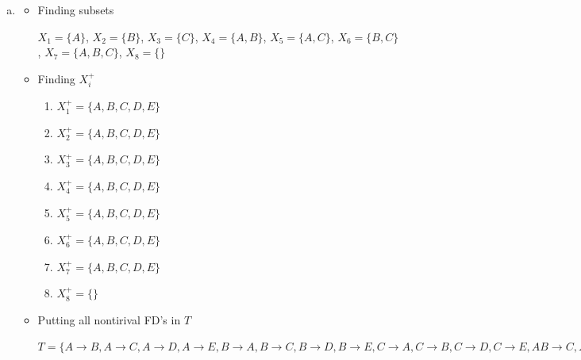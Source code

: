 \documentclass[12pt]{article}
\begin{document}
\begin{enumerate}[1.]
\begin{enumerate}[a)]
\begin{itemize}
            \item Putting all nontirival FD's in $T$

            $T = \{AB \to D, AC \to B, AC \to D, AC \to E, BC \to A, BC \to D, BC \to E,
                   ABC \to D, ABC \to E\}$

            \item Finding minimal basis for the FD of $S$

            $T_{\text{minimal}} = \{A \to D, AC \to B, C \to A, C \to B, C \to E\}$

        \end{itemize}

        \item

        \begin{itemize}
            \item Finding subsets

            $X_1 = \{A\}$, $X_2 = \{B\}$, $X_3 = \{C\}$, $X_4 = \{A,B\}$, $X_5 = \{A,C\}$,
            $X_6 = \{B,C\}$, $X_7 = \{A,B,C\}$, $X_8 = \{\}$


            \item Finding $X_i^+$
            \begin{enumerate}[1.]
                \item $X_1^+ = \{A,B,C,D,E\}$
                \item $X_2^+ = \{A,B,C,D,E\}$
                \item $X_3^+ = \{A,B,C,D,E\}$
                \item $X_4^+ = \{A,B,C,D,E\}$
                \item $X_5^+ = \{A,B,C,D,E\}$
                \item $X_6^+ = \{A,B,C,D,E\}$
                \item $X_7^+ = \{A,B,C,D,E\}$
                \item $X_8^+ = \{\}$
            \end{enumerate}

            \item Putting all nontirival FD's in $T$

            $T = \{
                    A \to B,
                    A \to C,
                    A \to D,
                    A \to E,
                    B \to A,
                    B \to C,
                    B \to D,
                    B \to E,
                    C \to A,
                    C \to B,
                    C \to D,
                    C \to E,
                   AB \to C,
                   AB \to D,
                   AB \to E,
                   AC \to B,
                   AC \to D,
                   AC \to E,
                   BC \to A,
                   BC \to D,
                   BC \to E,
                  ABC \to D,
                  ABC \to E
                \}$


\end{itemize}
\end{enumerate}
\end{enumerate}
\end{document}
